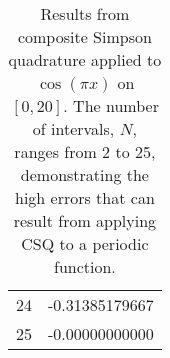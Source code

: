 \begin{table}[H]
\begin{tabular}{lr}
        
        \\
    
        
            24
             
               &
            
        
            -0.31385179667
            
        
        \\
    
        
            25
             
               &
            
        
            -0.00000000000
            
        
        \\
    
    \hline
    \end{tabular}
    \caption{Results from composite Simpson quadrature applied to $\cos(\pi x)$ on $[0,20]$. The number of intervals, $N$, ranges from 2 to 25, demonstrating the high errors that can result from applying CSQ to a periodic function.}
    \label{tab:cospix}
\end{table}